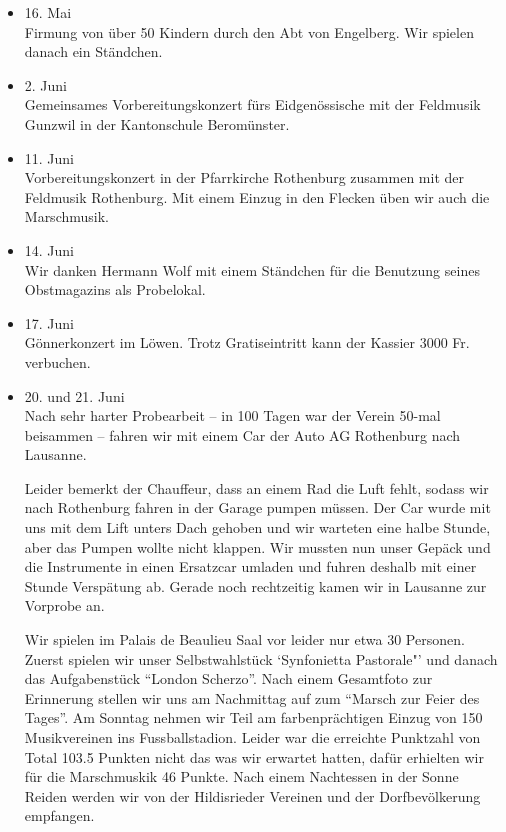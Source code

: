 \begin{multicols}{2}
\begin{itemize}
        \item[]16. Mai\\
        Firmung von über 50 Kindern durch den Abt von Engelberg. Wir spielen
        danach ein Ständchen.

        \item[]2. Juni\\
        Gemeinsames Vorbereitungskonzert fürs Eidgenössische mit der Feldmusik
        Gunzwil in der Kantonschule Beromünster.

        \item[]11. Juni\\
        Vorbereitungskonzert in der Pfarrkirche Rothenburg zusammen mit der
        Feldmusik Rothenburg. Mit einem Einzug in den Flecken üben wir auch die
        Marschmusik.

        \item[]14. Juni\\
        Wir danken Hermann Wolf mit einem Ständchen für die Benutzung seines
        Obstmagazins als Probelokal.

        \item[]17. Juni\\
        Gönnerkonzert im Löwen. Trotz Gratiseintritt kann der Kassier 3000 Fr.
        verbuchen.

        \item[]20. und 21. Juni\\
        Nach sehr harter Probearbeit -- in 100 Tagen war der Verein 50-mal
        beisammen -- fahren wir mit einem Car der Auto AG Rothenburg nach
        Lausanne.

        Leider bemerkt der Chauffeur, dass an einem Rad die Luft fehlt, sodass
        wir nach Rothenburg fahren in der Garage pumpen müssen. Der Car wurde
        mit uns mit dem Lift unters Dach gehoben und wir warteten eine halbe
        Stunde, aber das Pumpen wollte nicht klappen. Wir mussten nun unser
        Gepäck und die Instrumente in einen Ersatzcar umladen und fuhren deshalb
        mit einer Stunde Verspätung ab. Gerade noch rechtzeitig kamen wir in
        Lausanne zur Vorprobe an.

        Wir spielen im Palais de Beaulieu Saal vor leider nur etwa 30 Personen.
        Zuerst spielen wir unser Selbstwahlstück `Synfonietta Pastorale"' und
        danach das Aufgabenstück "`London Scherzo"'. Nach einem Gesamtfoto zur
        Erinnerung stellen wir uns am Nachmittag auf zum "`Marsch zur Feier des
        Tages"'. Am Sonntag nehmen wir Teil am farbenprächtigen Einzug von 150
        Musikvereinen ins Fussballstadion. Leider war die erreichte Punktzahl
        von Total 103.5 Punkten nicht das was wir erwartet hatten, dafür
        erhielten wir für die Marschmuskik 46 Punkte. Nach einem Nachtessen in
        der Sonne Reiden werden wir von der Hildisrieder Vereinen und der
        Dorfbevölkerung empfangen.


\end{itemize}
\end{multicols}
